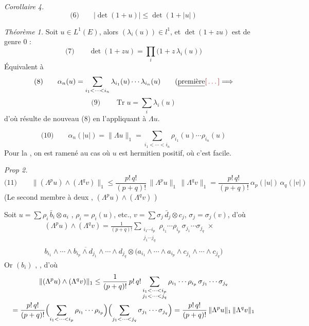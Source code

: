 \documentclass[11pt,a4paper]{article}
\begin{document}
 

\emph{Corollaire 4.}
\[
  \text{(6)}\qquad |\det(1+u)| \leq \det(1+|u|)
\]

\emph{Théorème 1.} Soit $u \in L^{1}(E)$, alors  $(\lambda_i(u)) \in l^{1}$, et $\det(1+zu)$ est de genre $0$ :
\[
  \text{(7)}\qquad \det(1+zu) = \prod_i \bigl(1 + z\,\lambda_i(u)\bigr)
\]
Équivalent à
\[
  \text{(8)}\qquad \alpha_n(u) = \sum_{i_1 < \cdots < i_n} \lambda_{i_1}(u) \cdots \lambda_{i_n}(u) \qquad (\uncertain{\text{première}} \ill{} \Longrightarrow
\]
\[
  \text{(9)}\qquad \operatorname{Tr} u = \sum_i \lambda_i(u)
\]
d'où résulte de nouveau (8) en l'appliquant à $\Lambda u$.

\[
  \text{(10)}\qquad \alpha_n(|u|) = \|\Lambda u\|_1 = \sum_{i_1 < \cdots < i_n} \rho_{i_1}(u) \cdots \rho_{i_n}(u)
\]
Pour la , on est ramené au cas où $u$ est hermitien positif, où c'est facile.

\emph{Prop 2.} 
\[
  \text{(11)}\qquad \|(\Lambda^{p} u) \wedge (\Lambda^{q} v)\|_1 \leq \frac{p!\, q!}{(p+q)!}\, \|\Lambda^{p} u\|_1\, \|\Lambda^{q} v\|_1 = \frac{p!\, q!}{(p+q)!}\, \alpha_p(|u|)\, \alpha_q(|v|)
\]
(Le second membre \ill{} à deux ,  $(\Lambda^{p} u) \wedge (\Lambda^{q} v)$     ) 

Soit $u = \sum \rho_i\, \bar{b}_i \otimes a_i$ , $\rho_i = \rho_i(u)$, etc., $v = \sum \sigma_j\, \bar{d}_j \otimes c_j$, $\sigma_j = \sigma_j(v)$, d'où
\begin{gather}
  (\Lambda^{p} u) \wedge (\Lambda^{q} v) = \frac{1}{(p+q)!} \sum_{\substack{i_1 \cdots i_p \\ j_1 \cdots j_q}} \rho_{i_1} \cdots \rho_{i_p}\, \sigma_{j_1} \cdots \sigma_{j_q}\; \times \\
  \overline{b_{i_1} \wedge \cdots \wedge b_{i_p} \wedge d_{j_1} \wedge \cdots \wedge d_{j_q}} \otimes \bigl(a_{i_1} \wedge \cdots \wedge a_{i_p} \wedge c_{j_1} \wedge \cdots \wedge c_{j_q}\bigr)
\end{gather}
Or \ill{}  $(b_i)$ \ill{}  \ill{}, \ill{}, d'où
\begin{gather}
  \|(\Lambda^{p} u) \wedge (\Lambda^{q} v)\|_1 \leq \frac{1}{(p+q)!}\, p!\, q! \sum_{\substack{i_1 < \cdots < i_p \\ j_1 < \cdots < j_q}} \rho_{i_1} \cdots \rho_{i_p}\, \sigma_{j_1} \cdots \sigma_{j_q} \\
  = \frac{p!\, q!}{(p+q)!} \Bigl(\sum_{i_1 < \cdots < i_p} \rho_{i_1} \cdots \rho_{i_p}\Bigr) \Bigl(\sum_{j_1 < \cdots < j_q} \sigma_{j_1} \cdots \sigma_{j_q}\Bigr) = \frac{p!\, q!}{(p+q)!}\, \|\Lambda^{p} u\|_1\, \|\Lambda^{q} v\|_1
\end{gather}
\end{document}
